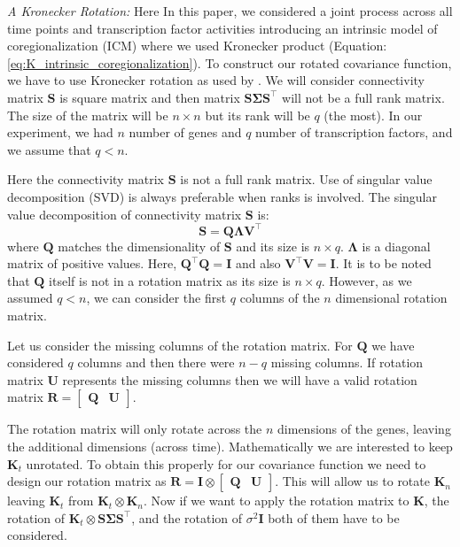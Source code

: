 \emph{A Kronecker Rotation:}
Here In this paper, we considered a joint process across all time points and transcription factor activities introducing an intrinsic model of coregionalization (ICM) where we used Kronecker product (Equation: \ref{eq:K_intrinsic_coregionalization}). 
To construct our rotated covariance function, we have to use Kronecker rotation as used by \cite{Stegle:2011}. We will consider connectivity matrix $\mathbf{S}$ is square matrix and then matrix $\mathbf{S}\boldsymbol{\Sigma}\mathbf{S}^\top$ will not be a full rank matrix. The size of the matrix will be $n\times n$ but its rank will be $q$ (the most). In our experiment, we had $n$ number of genes and $q$ number of transcription factors, and we assume that $q<n$. 

Here the connectivity matrix $\mathbf{S}$ is not a full rank matrix. Use of singular value decomposition (SVD) is always preferable when ranks is involved. The singular value decomposition of connectivity matrix $\mathbf{S}$ is:
\begin{equation} \label{eq:SVD}
\mathbf{S} = \mathbf{Q} \boldsymbol{\Lambda} \mathbf{V}^\top
\end{equation}
where $\mathbf{Q}$ matches the dimensionality of $\mathbf{S}$ and its size is $n\times q$. $\boldsymbol{\Lambda}$ is a diagonal matrix of positive values. Here, $\mathbf{Q}^\top \mathbf{Q} = \mathbf{I}$ and also $\mathbf{V}^\top \mathbf{V} = \mathbf{I}$. 
It is to be noted that $\mathbf{Q}$ itself is not in a rotation matrix as its size is $n\times q$. However, as we assumed $q<n$, we can consider the first $q$ columns of the $n$ dimensional rotation matrix. 

Let us consider the missing columns of the rotation matrix. For $\mathbf{Q}$ we have considered $q$ columns and then there were $n-q$ missing columns. If rotation matrix $\mathbf{U}$ represents the missing columns then we will have a valid rotation matrix $\mathbf{R}=\begin{bmatrix} \mathbf{Q}& \mathbf{U}\end{bmatrix}$. 

The rotation matrix will only rotate across the $n$ dimensions of the genes, leaving the additional dimensions (across time). Mathematically we are interested to keep $\mathbf{K}_t$ unrotated. To obtain this properly for our covariance function we need to design our rotation matrix as $\mathbf{R} = \mathbf{I} \otimes \begin{bmatrix} \mathbf{Q}& \mathbf{U}\end{bmatrix}$. This will allow us to rotate $\mathbf{K}_n$  leaving $\mathbf{K}_t$  from $\mathbf{K}_t\otimes \mathbf{K}_n$. Now if we want to apply the rotation matrix to $\mathbf{K}$,  the rotation of $\mathbf{K}_t \otimes \mathbf{S}\boldsymbol{\Sigma}\mathbf{S}^\top$, and the rotation of $\sigma^2 \mathbf{I}$ both of them have to be considered.

